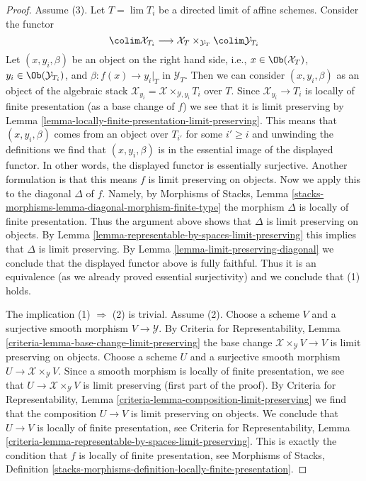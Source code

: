 \begin{proof}
Assume (3). Let $T = \lim T_i$ be a directed limit of affine schemes.
Consider the functor
$$
\colim \mathcal{X}_{T_i} \longrightarrow
\mathcal{X}_T \times_{\mathcal{Y}_T} \colim \mathcal{Y}_{T_i}
$$
Let $(x, y_i, \beta)$ be an object on the right hand side, i.e.,
$x \in \Ob(\mathcal{X}_T)$, $y_i \in \Ob(\mathcal{Y}_{T_i})$, and
$\beta : f(x) \to y_i|_T$ in $\mathcal{Y}_T$.
Then we can consider $(x, y_i, \beta)$ as an object of the
algebraic stack $\mathcal{X}_{y_i} = \mathcal{X} \times_{\mathcal{Y}, y_i} T_i$
over $T$. Since $\mathcal{X}_{y_i} \to T_i$ is locally of finite presentation
(as a base change of $f$) we see that it is limit preserving
by Lemma \ref{lemma-locally-finite-presentation-limit-preserving}.
This means that $(x, y_i, \beta)$ comes from an object over $T_{i'}$
for some $i' \geq i$ and unwinding the definitions we find that
$(x, y_i, \beta)$ is in the essential image of the displayed functor.
In other words, the displayed functor is essentially surjective.
Another formulation is that this means
$f$ is limit preserving on objects.
Now we apply this to the diagonal $\Delta$ of $f$. Namely,
by Morphisms of Stacks, Lemma
\ref{stacks-morphisms-lemma-diagonal-morphism-finite-type}
the morphism $\Delta$ is locally of finite presentation.
Thus the argument above shows that $\Delta$ is limit preserving on objects.
By Lemma \ref{lemma-representable-by-spaces-limit-preserving}
this implies that $\Delta$ is limit preserving.
By Lemma \ref{lemma-limit-preserving-diagonal}
we conclude that the displayed functor above is fully faithful.
Thus it is an equivalence (as we already proved essential surjectivity)
and we conclude that (1) holds.

\medskip\noindent
The implication (1) $\Rightarrow$ (2) is trivial. Assume (2).
Choose a scheme $V$ and a surjective smooth morphism $V \to \mathcal{Y}$.
By Criteria for Representability, Lemma
\ref{criteria-lemma-base-change-limit-preserving}
the base change $\mathcal{X} \times_\mathcal{Y} V \to V$
is limit preserving on objects.
Choose a scheme $U$ and a surjective smooth morphism
$U \to \mathcal{X} \times_\mathcal{Y} V$.
Since a smooth morphism is locally of finite presentation,
we see that $U \to \mathcal{X} \times_\mathcal{Y} V$ is
limit preserving (first part of the proof).
By Criteria for Representability, Lemma
\ref{criteria-lemma-composition-limit-preserving}
we find that the composition $U \to V$ is limit preserving
on objects. We conclude that $U \to V$ is locally of finite presentation, see
Criteria for Representability, Lemma
\ref{criteria-lemma-representable-by-spaces-limit-preserving}.
This is exactly the condition that $f$ is locally of finite presentation, see
Morphisms of Stacks, Definition
\ref{stacks-morphisms-definition-locally-finite-presentation}.
\end{proof}







